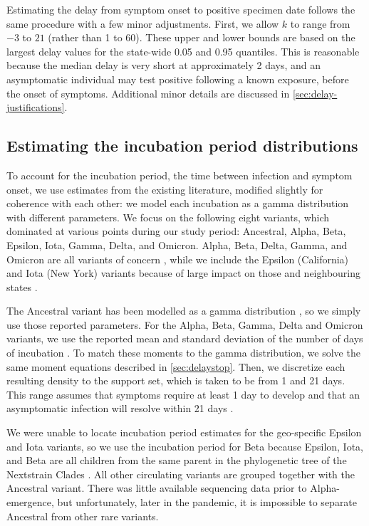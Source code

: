 Estimating the delay from symptom onset to positive specimen date follows the
same procedure with a few minor adjustments. First, we allow $k$ to range from
$-3$ to $21$ (rather than 1 to 60). These upper and lower bounds are based on
the largest delay values for the state-wide 0.05 and 0.95 quantiles. This is
reasonable because the median delay is very short at approximately 2 days, and
an asymptomatic individual may test positive following a known exposure, before
the onset of symptoms. Additional minor details are discussed in
\autoref{sec:delay-justifications}.



\subsection{Estimating the incubation period distributions} 
\label{sec:incubation}

To account for the incubation period, the time between infection and symptom
onset, we use estimates from the existing literature, modified slightly for
coherence with each other: we model each incubation as a gamma distribution with
different parameters. We focus on the following eight variants, which dominated
at various points during our study period: Ancestral, Alpha, Beta, Epsilon,
Iota, Gamma, Delta, and Omicron. Alpha, Beta, Delta, Gamma, and Omicron are all
variants of concern \citep{who2021tracking}, while we include the Epsilon
(California) and Iota (New York) variants because of large impact on those and
neighbouring states \citep{yang2022investigation, duerr2021dominance}.

The Ancestral variant has been modelled as a gamma distribution
\citep{tindale2020evidence}, so we simply use those reported parameters. For the
Alpha, Beta, Gamma, Delta and Omicron variants, we use the reported mean and
standard deviation of the number of days of incubation \citep{tanaka2022shorter,
grant2022impact, ogata2022shorter}. To match these moments to the gamma
distribution, we solve the same moment equations described in
\autoref{sec:delaystop}. Then, we discretize each resulting density to the
support set, which is taken to be from 1 and 21 days. This range assumes that
symptoms require at least 1 day to develop \citealp{phcan2021covid} and that an
asymptomatic infection will resolve within 21 days
\citep{zaki2021estimations,cortes2022sars}.

We were unable to locate incubation period estimates for the geo-specific
Epsilon and Iota variants, so we use the incubation period for Beta because
Epsilon, Iota, and Beta are all children from the same parent in the
phylogenetic tree of the Nextstrain Clades \citep{hodcroft2021covariants}. All
other circulating variants are grouped together with the Ancestral variant.
There was little available sequencing data prior to Alpha-emergence, but
unfortunately, later in the pandemic, it is impossible to separate Ancestral
from other rare variants.

